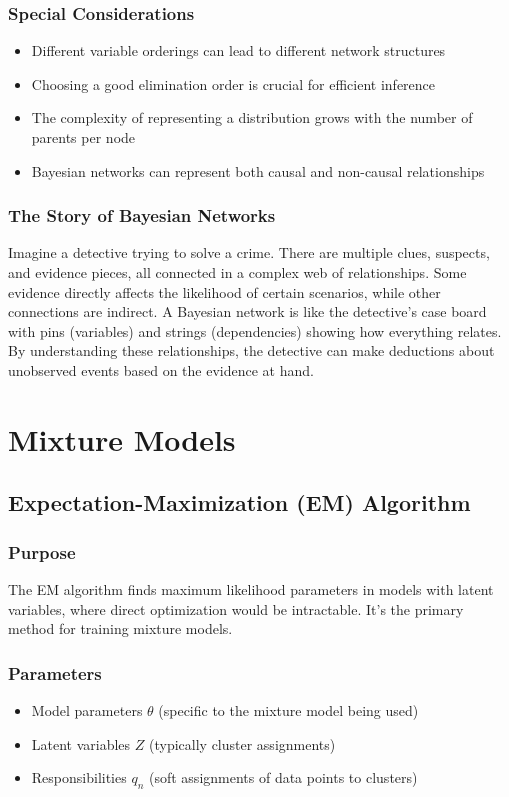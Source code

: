 \documentclass{article}
\begin{document}
\subsubsection{Special Considerations}
\begin{itemize}
    \item Different variable orderings can lead to different network structures
    \item Choosing a good elimination order is crucial for efficient inference
    \item The complexity of representing a distribution grows with the number of parents per node
    \item Bayesian networks can represent both causal and non-causal relationships
\end{itemize}

\subsubsection{The Story of Bayesian Networks}
Imagine a detective trying to solve a crime. There are multiple clues, suspects, and evidence pieces, all connected in a complex web of relationships. Some evidence directly affects the likelihood of certain scenarios, while other connections are indirect. A Bayesian network is like the detective's case board with pins (variables) and strings (dependencies) showing how everything relates. By understanding these relationships, the detective can make deductions about unobserved events based on the evidence at hand.

\section{Mixture Models}

\subsection{Expectation-Maximization (EM) Algorithm}

\subsubsection{Purpose}
The EM algorithm finds maximum likelihood parameters in models with latent variables, where direct optimization would be intractable. It's the primary method for training mixture models.

\subsubsection{Parameters}
\begin{itemize}
    \item Model parameters $\theta$ (specific to the mixture model being used)
    \item Latent variables $Z$ (typically cluster assignments)
    \item Responsibilities $q_n$ (soft assignments of data points to clusters)
\end{itemize}
\end{document}
